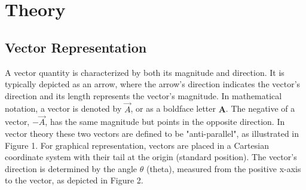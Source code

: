 \documentclass{report}
\begin{document}
    \bigbreak \noindent 
    \section{Theory}
    \bigbreak \noindent 
    \subsection{Vector Representation}
    A vector quantity is characterized by both its magnitude and direction. It is typically depicted as an arrow, where the arrow's direction indicates the vector's direction and its length represents the vector's magnitude. In mathematical notation, a vector is denoted by \( \vec{A} \), or as a boldface letter \( \mathbf{A} \). The negative of a vector, \( -\vec{A} \), has the same magnitude but points in the opposite direction. In vector theory these two vectors are defined to be "anti-parallel", as illustrated in Figure 1.
    \bigbreak \noindent 
    For graphical representation, vectors are placed in a Cartesian coordinate system with their tail at the origin (standard position). The vector's direction is determined by the angle \( \theta \) (theta), measured from the positive x-axis to the vector, as depicted in Figure 2.
    \bigbreak \noindent 
    \begin{figure}[ht]
        \centering
        \label{fig:fig1}
    \end{figure}
    \pagebreak \bigbreak \noindent 
    \begin{figure}[ht]
        \centering
        \label{fig:fig23}
    \end{figure}
    \bigbreak \noindent 
    \bigbreak \noindent 
\end{document}

